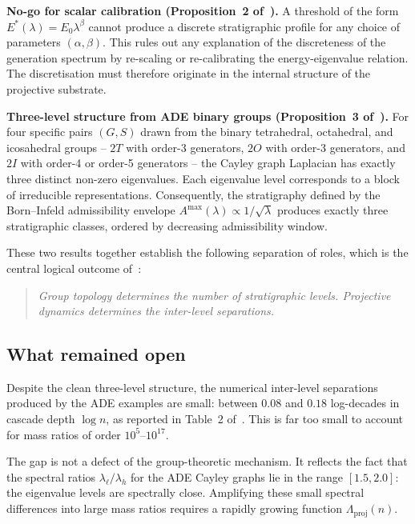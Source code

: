 \documentclass[12pt, a4paper]{article}
\theoremstyle{plain}
\theoremstyle{definition}
\theoremstyle{remark}
\begin{document}
      \medskip
      \noindent\textbf{No-go for scalar calibration (Proposition~2
  of~\cite{Beau2026a4}).}
      A threshold of the form $E^*(\lambda) = E_0 \lambda^\beta$ cannot produce a
      discrete stratigraphic profile for any choice of parameters $(\alpha, \beta)$.
      This rules out any explanation of the discreteness of the generation spectrum
      by re-scaling or re-calibrating the energy-eigenvalue relation.
      The discretisation must therefore originate in the internal structure of the
      projective substrate.

      \medskip
      \noindent\textbf{Three-level structure from ADE binary groups
    (Proposition~3 of~\cite{Beau2026a4}).}
      For four specific pairs $(G, S)$ drawn from the binary tetrahedral, octahedral,
      and icosahedral groups -- $2T$ with order-3 generators, $2O$ with order-3
      generators, and $2I$ with order-4 or order-5 generators -- the Cayley graph
      Laplacian has exactly three distinct non-zero eigenvalues.
      Each eigenvalue level corresponds to a block of irreducible representations.
      Consequently, the stratigraphy defined by the Born--Infeld admissibility
      envelope $A^{\max}(\lambda) \propto 1/\sqrt{\lambda}$ produces exactly three
      stratigraphic classes, ordered by decreasing admissibility window.

      These two results together establish the following separation of roles, which
      is the central logical outcome of~\cite{Beau2026a4}:
      \begin{quote}
        \emph{Group topology determines the number of stratigraphic levels.
        Projective dynamics determines the inter-level separations.}
      \end{quote}

    \subsection{What remained open}
      \label{sec:intro:open}

      Despite the clean three-level structure, the numerical inter-level separations
      produced by the ADE examples are small: between $0.08$ and $0.18$ log-decades
      in cascade depth $\log n$, as reported in Table~2 of~\cite{Beau2026a4}.
      This is far too small to account for mass ratios of order $10^5$--$10^{17}$.

      The gap is not a defect of the group-theoretic mechanism.
      It reflects the fact that the spectral ratios $\lambda_\ell / \lambda_h$ for
      the ADE Cayley graphs lie in the range $[1.5, 2.0]$: the eigenvalue levels are
      spectrally close.
      Amplifying these small spectral differences into large mass ratios requires a
      rapidly growing function $\Lambda_{\mathrm{proj}}(n)$.
\end{document}
